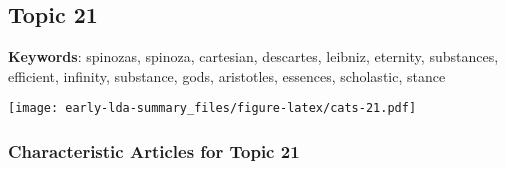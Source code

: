\documentclass[
]{article}
\begin{document}
\newpage

\hypertarget{topic-21}{%
\subsection{Topic 21}\label{topic-21}}

\textbf{Keywords}: spinozas, spinoza, cartesian, descartes, leibniz,
eternity, substances, efficient, infinity, substance, gods, aristotles,
essences, scholastic, stance

\texttt{[image: early-lda-summary\_files/figure-latex/cats-21.pdf]}
\newpage 

\hypertarget{characteristic-articles-for-topic-21}{%
\subsubsection{Characteristic Articles for Topic
21}\label{characteristic-articles-for-topic-21}}
\end{document}
